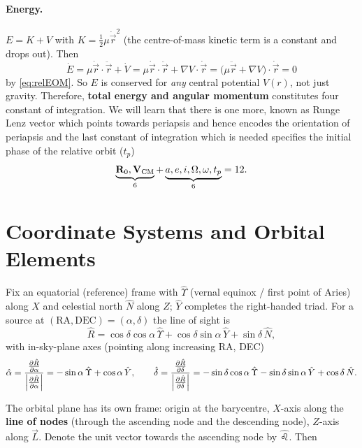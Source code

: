 \documentclass[11pt]{article}
\newcommand{\vecr}{\vec r}
\newcommand{\vecL}{\vec L}
\newcommand{\hatn}{\hat \leo}
\begin{document}
\paragraph{Energy.} $E=K+V$ with $K=\tfrac12\mu\dot{\vecr}^2$ (the centre-of-mass kinetic term is a constant and drops out). Then
\[
\dot E = \mu\dot{\vecr}\cdot\ddot{\vecr}+\dot V
=\mu\dot{\vecr}\cdot\ddot{\vecr}+\nabla V\cdot\dot{\vecr}
=\big(\mu\ddot{\vecr}+\nabla V\big)\cdot\dot{\vecr}=0
\]
by \eqref{eq:relEOM}. So $E$ is conserved for \emph{any} central potential $V(r)$, not just gravity. Therefore, \textbf{total energy and angular momentum} constitutes four constant of integration. We will learn that there is one more, known as Runge Lenz vector which points towards periapsis and hence encodes the orientation of periapsis and the last constant of integration which is needed specifies the initial phase of the relative orbit ($t_p$)
\[
\underbrace{\mathbf R_0,\mathbf V_{\rm CM}}_{6}
+
\underbrace{a,e,i,\Omega,\omega,t_p}_{6}
=12.
\]

\section{Coordinate Systems and Orbital Elements}

Fix an equatorial (reference) frame with $\hat\Upsilon$ (vernal equinox / first point of Aries) along $X$ and celestial north $\hat N$ along $Z$; $\hat Y$ completes the right-handed triad. For a source at $(\mathrm{RA},\mathrm{DEC})=(\alpha,\delta)$ the line of sight is
\[
\hat R = \cos\delta\cos\alpha\,\hat\Upsilon+\cos\delta\sin\alpha\,\hat Y+\sin\delta\,\hat N,
\]
with in-sky-plane axes (pointing along increasing RA, DEC)
\[
\hat\alpha=\frac{\pdv{\hat R}{\alpha}}{\abs{\pdv{\hat R}{\alpha}}}=-\sin\alpha\,\hat\Upsilon+\cos\alpha\,\hat Y,\qquad
\hat\delta=\frac{\pdv{\hat R}{\delta}}{\abs{\pdv{\hat R}{\delta}}}=-\sin\delta\cos\alpha\,\hat\Upsilon-\sin\delta\sin\alpha\,\hat Y+\cos\delta\,\hat N.
\]

The orbital plane has its own frame: origin at the barycentre, $X$-axis along the \textbf{line of nodes} (through the ascending node and the descending node), $Z$-axis along $\vecL$. Denote the unit vector towards the ascending node by $\hatn$. Then
\end{document}
